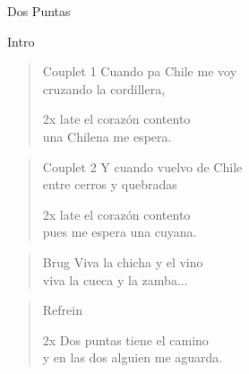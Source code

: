 \begin{song}[cuenca]{Dos Puntas}

\begin{instrumental}{Intro}
\measure{}\measure{}\measure{}\measure{}\measure{}\measure{}\measure{}
\end{instrumental}

\begin{verse}{Couplet 1}
Cuando pa Chile me voy\\
cruzando la cordillera,\\
\begin{sidenote}{2x}
late el corazón contento \\
una Chilena me espera.
\end{sidenote}
\end{verse}

\begin{verse}{Couplet 2}
Y cuando vuelvo de Chile\\
entre cerros y quebradas\\
\begin{sidenote}{2x}
late el corazón contento \\
pues me espera una cuyana.  
\end{sidenote}
\end{verse}

\begin{verse}{Brug}
Viva la chicha y el vino\\
viva la cueca y la zamba...\\
\end{verse}

\begin{verse}{Refrein}
\begin{sidenote}{2x}
Dos puntas tiene el camino \\
y en las dos alguien me aguarda.
\end{sidenote}
\end{verse}


\end{song}
